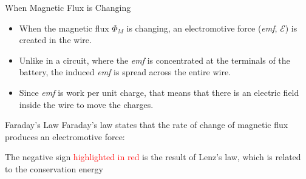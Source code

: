 \documentclass[12pt,aspectratio=169]{beamer}
\newcommand{\mb}[1]{\mathbf{#1}}
\newcommand{\eq}[2]{\vspace{#1}{\Large\begin{displaymath}#2\end{displaymath}}}
\begin{document}
\begin{frame}{When Magnetic Flux is Changing}
  \begin{itemize}
  \item When the magnetic flux $\Phi_M$ is changing, an electromotive force
    (\emph{emf}, $\mathcal{E}$) is created in the wire.
  \item Unlike in a circuit, where the \emph{emf} is concentrated at the
    terminals of the battery, the induced \emph{emf} is spread across the
    entire wire.
%    
    \item Since \emph{emf} is work per unit charge, that means that there is an
      electric field inside the wire to move the charges.
    \end{itemize}
\end{frame}


\begin{frame}{Faraday's Law}
  Faraday's law states that the rate of change of magnetic flux produces an
  electromotive force:

  \eq{-.2in}{
    \boxed{
      \overline{\mathcal{E}}={\color{red}{-}}\frac{\Delta\Phi_M}{\Delta t}
    }
  }
  
  The negative sign {\textcolor{red}{highlighted in red}} is the result of
  Lenz's law, which is related to the conservation energy
\end{frame}
\end{document}
